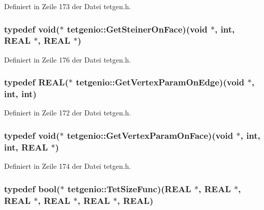 Definiert in Zeile 173 der Datei tetgen.\-h.

\hypertarget{classtetgenio_a1f2d237a6b36007f8b3e3557cb9b5451}{
\subsubsection[{Get\-Steiner\-On\-Face}]{\setlength{\rightskip}{0pt plus 5cm}typedef void($\ast$  tetgenio\-::\-Get\-Steiner\-On\-Face)(void $\ast$, int, {\bf R\-E\-A\-L} $\ast$, {\bf R\-E\-A\-L} $\ast$)}}\label{classtetgenio_a1f2d237a6b36007f8b3e3557cb9b5451}


Definiert in Zeile 176 der Datei tetgen.\-h.

\hypertarget{classtetgenio_a57d18c4c976af43f3e9743a11f78f1f7}{
\subsubsection[{Get\-Vertex\-Param\-On\-Edge}]{\setlength{\rightskip}{0pt plus 5cm}typedef {\bf R\-E\-A\-L}($\ast$  tetgenio\-::\-Get\-Vertex\-Param\-On\-Edge)(void $\ast$, int, int)}}\label{classtetgenio_a57d18c4c976af43f3e9743a11f78f1f7}


Definiert in Zeile 172 der Datei tetgen.\-h.

\hypertarget{classtetgenio_a722d4a1ab76513e917be3466b85bb78f}{
\subsubsection[{Get\-Vertex\-Param\-On\-Face}]{\setlength{\rightskip}{0pt plus 5cm}typedef void($\ast$  tetgenio\-::\-Get\-Vertex\-Param\-On\-Face)(void $\ast$, int, int, {\bf R\-E\-A\-L} $\ast$)}}\label{classtetgenio_a722d4a1ab76513e917be3466b85bb78f}


Definiert in Zeile 174 der Datei tetgen.\-h.

\hypertarget{classtetgenio_aa1b228427a0bdabc66cead91dd4497b8}{
\subsubsection[{Tet\-Size\-Func}]{\setlength{\rightskip}{0pt plus 5cm}typedef bool($\ast$  tetgenio\-::\-Tet\-Size\-Func)({\bf R\-E\-A\-L} $\ast$, {\bf R\-E\-A\-L} $\ast$, {\bf R\-E\-A\-L} $\ast$, {\bf R\-E\-A\-L} $\ast$, {\bf R\-E\-A\-L} $\ast$, {\bf R\-E\-A\-L})}}\label{classtetgenio_aa1b228427a0bdabc66cead91dd4497b8}


